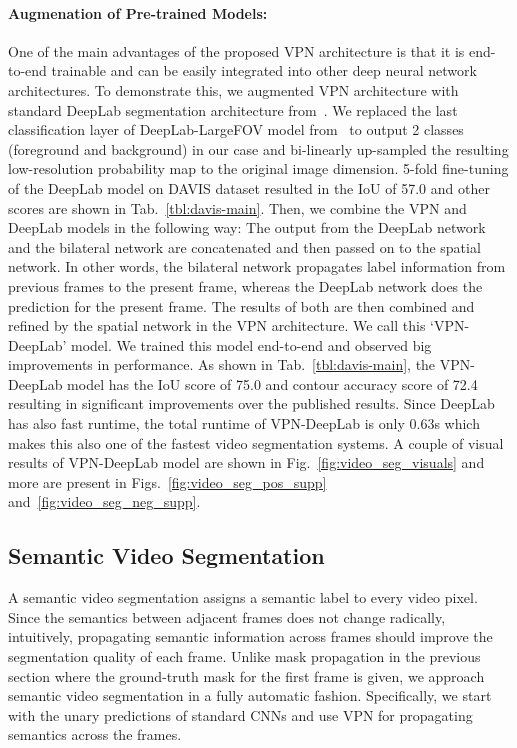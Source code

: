 \paragraph{Augmenation of Pre-trained Models:} One of the main advantages of the proposed
VPN architecture is that it is end-to-end trainable and can be easily integrated into
other deep neural network architectures. To demonstrate this, we augmented VPN architecture
with standard DeepLab segmentation architecture from~\cite{chen2014semantic}.
We replaced the last classification layer of DeepLab-LargeFOV model
from~\cite{chen2014semantic} to output 2 classes (foreground and background)
in our case and bi-linearly up-sampled the resulting low-resolution probability map to
the original image dimension. 5-fold fine-tuning of the DeepLab model on DAVIS dataset
resulted in the IoU of 57.0 and other scores are shown in Tab.~\ref{tbl:davis-main}.
Then, we combine the VPN and DeepLab models in the following way: The output from
the DeepLab network and the bilateral network are concatenated and then passed on to the spatial network.
In other words, the bilateral network propagates label information from previous frames to the present
frame, whereas the DeepLab network does the prediction for the present frame. The results
of both are then combined and refined by the spatial network in the VPN architecture.
We call this `VPN-DeepLab' model. We trained this model end-to-end and observed big
improvements in performance. As shown in Tab.~\ref{tbl:davis-main}, the VPN-DeepLab
model has the IoU score of 75.0 and contour accuracy score of 72.4 resulting
in significant improvements over the published results. Since DeepLab has also fast
runtime, the total runtime of VPN-DeepLab is only 0.63s which makes this also one of
the fastest video segmentation systems. A couple of visual results of
VPN-DeepLab model are shown in Fig.~\ref{fig:video_seg_visuals}
and more are present in
Figs.~\ref{fig:video_seg_pos_supp} and~\ref{fig:video_seg_neg_supp}.

\vspace{-0.2cm}
\subsection{Semantic Video Segmentation}

A semantic video segmentation assigns a semantic label to every video pixel.
Since the semantics between adjacent frames does not change
radically, intuitively, propagating semantic information across frames should improve
the segmentation quality of each frame. Unlike mask propagation in the previous
section where the ground-truth mask for the first frame is given, we approach
semantic video segmentation in a fully automatic fashion. Specifically, we start
with the unary predictions of standard CNNs and use VPN for propagating semantics across the frames.

